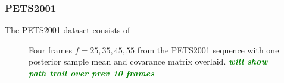 \documentclass[smallcondensed, final]{svjour3}
\newcommand{\willie}[1]{\textcolor{green}{\textsf{\emph{\textbf{\textcolor{green}{#1}}}}}}
\begin{document}

\subsubsection{PETS2001}

The PETS2001 dataset consists of


\begin{figure}
  \centering             
  \caption{Four frames $f=25, 35, 45, 55$ from the PETS2001 sequence with one posterior sample mean and covarance matrix overlaid. \willie{will show path trail over prev 10 frames}}
  \label{fig:pets2001_imgs}
\end{figure}
\end{document}
